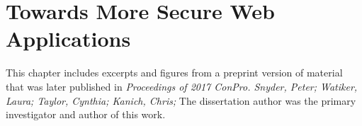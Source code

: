 \chapter{Towards More Secure Web Applications}
\label{future-web}

This chapter includes excerpts and figures from a preprint version of material
that was later published in \textit{Proceedings of 2017 ConPro. Snyder, Peter;
Watiker, Laura; Taylor, Cynthia; Kanich, Chris;} The dissertation author was
the primary investigator and author of this work.






